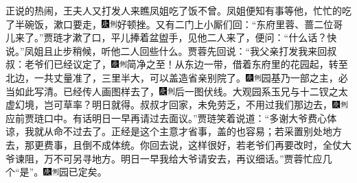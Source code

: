 正说的热闹，王夫人又打发人来瞧凤姐吃了饭不曾。凤姐便知有事等他，忙忙的吃了半碗饭，漱口要走，{\includegraphics[width=3mm]{../Images/00004}\includegraphics[width=3mm]{../Images/00011}\footnotesize \kaishu 好顿挫。}又有二门上小厮们回：``东府里蓉、蔷二位哥儿来了。''贾琏才漱了口，平儿捧着盆盥手，见他二人来了，便问：``什么话？快说。''凤姐且止步稍候，听他二人回些什么。贾蓉先回说：``我父亲打发我来回叔叔：老爷们已经议定了，{\includegraphics[width=3mm]{../Images/00004}\includegraphics[width=3mm]{../Images/00011}\footnotesize \kaishu 简净之至！}从东边一带，借着东府里的花园起，转至北边，一共丈量准了，三里半大，可以盖造省亲别院了。{\includegraphics[width=3mm]{../Images/00004}\includegraphics[width=3mm]{../Images/00011}\footnotesize \kaishu 园基乃一部之主，必当如此写清。}已经传人画图样去了，{\includegraphics[width=3mm]{../Images/00004}\includegraphics[width=3mm]{../Images/00011}\footnotesize \kaishu 后一图伏线。大观园系玉兄与十二钗之太虚幻境，岂可草率？}明日就得。叔叔才回家，未免劳乏，不用过我们那边去，{\includegraphics[width=3mm]{../Images/00004}\includegraphics[width=3mm]{../Images/00011}\footnotesize \kaishu 应前贾琏口中。}有话明日一早再请过去面议。''贾琏笑着说道：``多谢大爷费心体谅，我就从命不过去了。正经是这个主意才省事，盖的也容易；若采置别处地方去，那更费事，且倒不成体统。你回去说，这样很好，若老爷们再要改时，全仗大爷谏阻，万不可另寻地方。明日一早我给大爷请安去，再议细话。''贾蓉忙应几个``是''。{\includegraphics[width=3mm]{../Images/00004}\includegraphics[width=3mm]{../Images/00011}\footnotesize \kaishu 园已定矣。}

